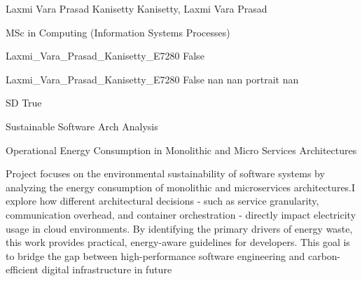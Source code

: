 \documentclass[twoside]{report}
\begin{document}
\begingroup{}\relax



\def\Key{Laxmi_Vara_Prasad_Kanisetty_E7280}

{Laxmi Vara Prasad Kanisetty}
{Kanisetty, Laxmi Vara Prasad}

{MSc in Computing (Information Systems Processes)}

{Laxmi_Vara_Prasad_Kanisetty_E7280}
{False}

{Laxmi_Vara_Prasad_Kanisetty_E7280}
{False}
{nan}
{nan}
{portrait}
{nan}

{SD}
{True}

{Sustainable Software Arch Analysis}

{Operational Energy Consumption in Monolithic and Micro Services Architectures}

{Project focuses on the environmental sustainability of software systems by analyzing the energy consumption of monolithic and microservices architectures.I explore how different architectural decisions - such as service granularity, communication overhead, and container orchestration - directly impact electricity usage in cloud environments. By identifying the primary drivers of energy waste, this work provides practical, energy-aware guidelines for developers. This goal is to bridge the gap between high-performance software engineering and carbon-efficient digital infrastructure in future}
\end{document}
